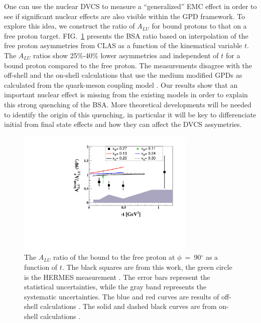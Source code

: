 \documentclass[twocolumn,nofootinbib,showpacs,prl,superscriptaddress,secnumarabic,amssymb,nobibnotes,aps,floatfix]{revtex4}
\begin{document}
One can use the nuclear DVCS to measure a ``generalized'' EMC effect in order 
to see if significant nuclear effects are also visible within the GPD 
framework.  To explore this idea, we construct the ratio of $A_{LU}$ for bound 
protons to that on a free proton target. 
FIG.~\ref{fig:incoh_EMC_ratio_ALU_proton} presents the BSA ratio based on 
interpolation of the free proton asymmetries from CLAS \cite{Girod:2007aa} as a 
function of the kinematical variable $t$. The $A_{LU}$ ratios show 25\%-40\% 
lower asymmetries and independent of $t$ for a bound proton compared to the 
free proton. The measurements disagree with the off-shell \cite{simonetta_2} 
and the on-shell calculations that use the medium modified GPDs as calculated 
from the quark-meson coupling model \cite{Guzey:2008fe}. Our results show that 
an important nuclear effect is missing from the existing models in order to 
explain this strong quenching of the BSA.  More theoretical developments will 
be needed to identify the origin of this quenching, in particular it will be 
key to differenciate initial from final state effects and how they can affect 
the DVCS assymetries.

\begin{figure}[tb]
\centering
\includegraphics[width=8.5cm]{figs/ALU_ratioInc_t_shortscenrario.pdf}
\caption{ The $A_{LU}$ ratio of the bound to the free proton at 
   $\phi$~=~90$^{\circ}$ as a function of $t$. The black squares are from this 
   work, the green circle is the HERMES measurement \cite{Airapetian:2009cga}.  
   The error bars represent the statistical uncertainties, while the gray band 
   represents the systematic uncertainties. The blue and red curves are results 
   of off-shell calculations \cite{simonetta_2}. The solid and dashed black 
   curves are from on-shell calculations \cite{Guzey:2008fe}.} 
   \label{fig:incoh_EMC_ratio_ALU_proton}
\end{figure}
\end{document}
